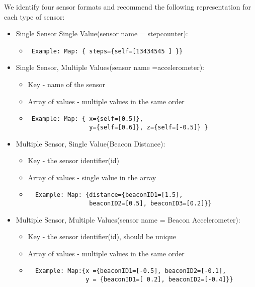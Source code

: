 We identify four sensor formats and recommend the following representation for each type of sensor:
\begin{itemize}
  \item Single Sensor Single Value(sensor name = stepcounter):
  \begin{itemize}
    \item \begin{verbatim} Example: Map: { steps={self=[13434545 ] }} \end{verbatim}                                                              
  \end{itemize}
 
  \item  Single Sensor, Multiple Values(sensor name =accelerometer):
  \begin{itemize}
    \item Key - name of the sensor
    \item Array of values - multiple values in the same order
    \item \begin{verbatim} Example: Map: { x={self=[0.5]},
                 y={self=[0.6]}, z={self=[-0.5]} } \end{verbatim}  
  \end{itemize}

 
  \item Multiple Sensor, Single Value(Beacon Distance):
  \begin{itemize}
    \item Key - the sensor identifier(id)
    \item Array of values - single value in the array
    \item  \begin{verbatim}  Example: Map: {distance={beaconID1=[1.5],
                 beaconID2=[0.5], beaconID3=[0.2]}} \end{verbatim}  
  \end{itemize}

  \item  Multiple Sensor, Multiple Values(sensor name = Beacon Accelerometer):
  \begin{itemize}
    \item Key - the sensor identifier(id), should be unique
    \item Array of values - multiple values in the same order
    \item  \begin{verbatim}  Example: Map:{x ={beaconID1=[-0.5], beaconID2=[-0.1],
                y = {beaconID1=[ 0.2], beaconID2=[-0.4]}} \end{verbatim}  
 \end{itemize}


\end{itemize}




